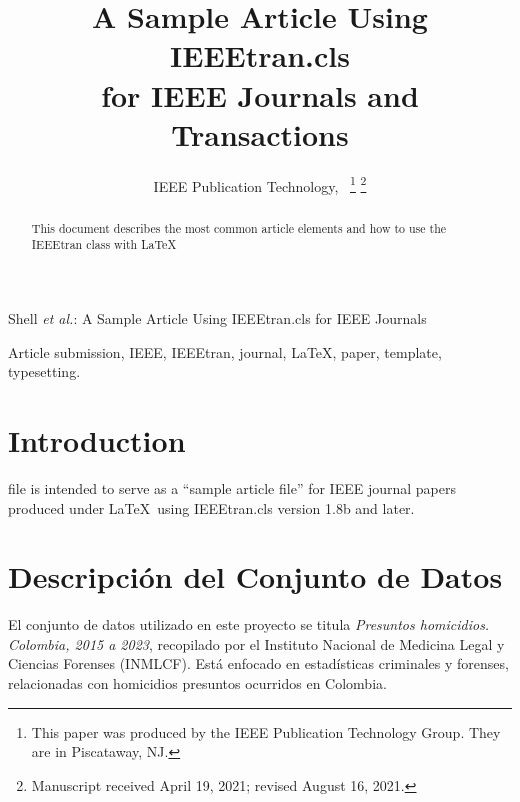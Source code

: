 \documentclass[lettersize,journal]{IEEEtran}
\begin{document}
\title{A Sample Article Using IEEEtran.cls\\ for IEEE Journals and Transactions}

\author{IEEE Publication Technology,~
\thanks{This paper was produced by the IEEE Publication Technology Group. They are in Piscataway, NJ.}%
\thanks{Manuscript received April 19, 2021; revised August 16, 2021.}}

%
{Shell \MakeLowercase{\textit{et al.}}: A Sample Article Using IEEEtran.cls for IEEE Journals}


\maketitle

\begin{abstract}
This document describes the most common article elements and how to use the IEEEtran class with \LaTeX \ 
\end{abstract}

\begin{IEEEkeywords}
Article submission, IEEE, IEEEtran, journal, \LaTeX, paper, template, typesetting.
\end{IEEEkeywords}

\section{Introduction}
 file is intended to serve as a ``sample article file''
for IEEE journal papers produced under \LaTeX\ using
IEEEtran.cls version 1.8b and later. 


\section{Descripción del Conjunto de Datos}

El conjunto de datos utilizado en este proyecto se titula \textit{Presuntos homicidios. Colombia, 2015 a 2023}, recopilado por el Instituto Nacional de Medicina Legal y Ciencias Forenses (INMLCF). Está enfocado en estadísticas criminales y forenses, relacionadas con homicidios presuntos ocurridos en Colombia.
\end{document}
